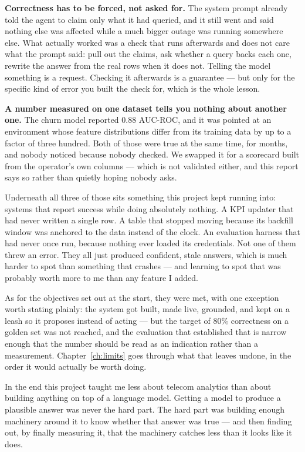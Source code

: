 \textbf{Correctness has to be forced, not asked for.} The system prompt already
told the agent to claim only what it had queried, and it still went and said
nothing else was affected while a much bigger outage was running somewhere else.
What actually worked was a check that runs afterwards and does not care what the
prompt said: pull out the claims, ask whether a query backs each one, rewrite
the answer from the real rows when it does not. Telling the model something is a
request. Checking it afterwards is a guarantee --- but only for the specific
kind of error you built the check for, which is the whole lesson.

\textbf{A number measured on one dataset tells you nothing about another one.}
The churn model reported 0.88 AUC-ROC, and it was pointed at an environment
whose feature distributions differ from its training data by up to a factor of
three hundred. Both of those were true at the same time, for months, and nobody
noticed because nobody checked. We swapped it for a scorecard built from the
operator's own columns --- which is not validated either, and this report says
so rather than quietly hoping nobody asks.

Underneath all three of those sits something this project kept running into:
systems that report success while doing absolutely nothing. A KPI updater that
had never written a single row. A table that stopped moving because its backfill
window was anchored to the data instead of the clock. An evaluation harness that
had never once run, because nothing ever loaded its credentials. Not one of them
threw an error. They all just produced confident, stale answers, which is much
harder to spot than something that crashes --- and learning to spot that was
probably worth more to me than any feature I added.

As for the objectives set out at the start, they were met, with one exception
worth stating plainly: the system got built, made live, grounded, and kept on a
leash so it proposes instead of acting --- but the target of 80\% correctness on
a golden set was not reached, and the evaluation that established that is narrow
enough that the number should be read as an indication rather than a
measurement. Chapter~\ref{ch:limits} goes through what that leaves undone, in
the order it would actually be worth doing.

In the end this project taught me less about telecom analytics than about
building anything on top of a language model. Getting a model to produce a
plausible answer was never the hard part. The hard part was building enough
machinery around it to know whether that answer was true --- and then finding
out, by finally measuring it, that the machinery catches less than it looks like
it does.

